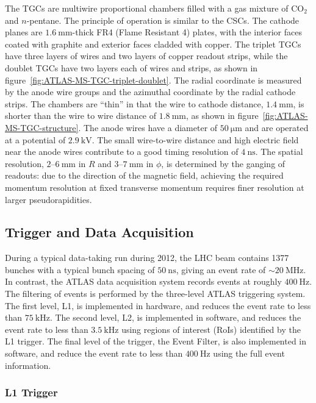 The TGCs are multiwire proportional chambers filled with a gas mixture of CO$_2$ and $n$-pentane. The principle of operation is similar to the CSCs. The cathode planes are $\SI{1.6}{\milli\meter}$-thick FR4 (Flame Resistant 4) plates, with the interior faces coated with graphite and exterior faces cladded with copper. The triplet TGCs have three layers of wires and two layers of copper readout strips, while the doublet TGCs have two layers each of wires and strips, as shown in figure~\ref{fig:ATLAS-MS-TGC-triplet-doublet}. The radial coordinate is measured by the anode wire groups and the azimuthal coordinate by the radial cathode strips. The chambers are ``thin'' in that the wire to cathode distance, $\SI{1.4}{\milli\meter}$, is shorter than the wire to wire distance of $\SI{1.8}{\milli\meter}$, as shown in figure~\ref{fig:ATLAS-MS-TGC-structure}. The anode wires have a diameter of $\SI{50}{\micro\meter}$ and are operated at a potential of $\SI{2.9}{\kilo\volt}$. The small wire-to-wire distance and high electric field near the anode wires contribute to a good timing resolution of $\SI{4}{\nano\second}$. The spatial resolution, $2$--$\SI{6}{\milli\meter}$ in $R$ and $3$--$\SI{7}{\milli\meter}$ in $\phi$, is determined by the ganging of readouts: due to the direction of the magnetic field, achieving the required momentum resolution at fixed transverse momentum requires finer resolution at larger pseudorapidities. 


\subsection{Trigger and Data Acquisition}
During a typical data-taking run during 2012, the LHC beam contains 1377 bunches with a typical bunch spacing of $\SI{50}{\nano\second}$, giving an event rate of $\sim \SI{20}{\mega\hertz}$. In contrast, the ATLAS data acquisition system records events at roughly $\SI{400}{\hertz}$. The filtering of events is performed by the three-level ATLAS triggering system. The first level, L1, is implemented in hardware, and reduces the event rate to less than $\SI{75}{\kilo\hertz}$. The second level, L2, is implemented in software, and reduces the event rate to less than $\SI{3.5}{\kilo\hertz}$ using regions of interest (RoIs) identified by the L1 trigger. The final level of the trigger, the Event Filter, is also implemented in software, and reduce the event rate to less than $\SI{400}{\hertz}$ using the full event information. 

\subsubsection{L1 Trigger}\label{sec:experiment-trigger-L1}

